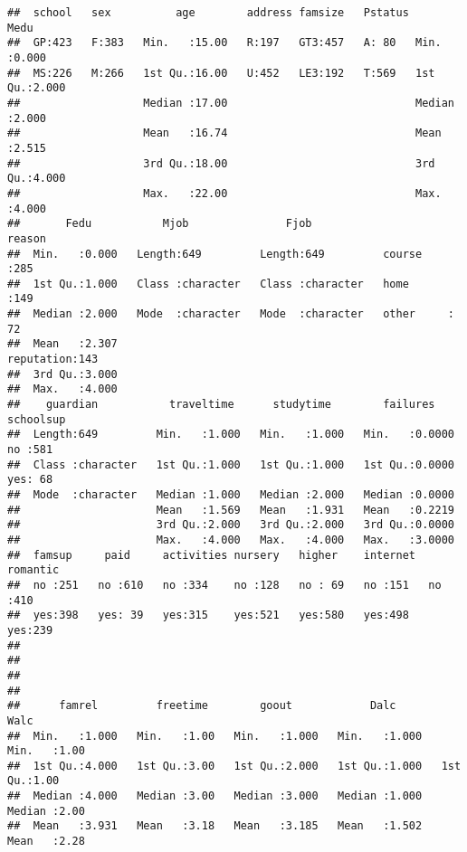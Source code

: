 \documentclass[
]{article}
\begin{document}
\begin{verbatim}
##  school   sex          age        address famsize   Pstatus      Medu      
##  GP:423   F:383   Min.   :15.00   R:197   GT3:457   A: 80   Min.   :0.000  
##  MS:226   M:266   1st Qu.:16.00   U:452   LE3:192   T:569   1st Qu.:2.000  
##                   Median :17.00                             Median :2.000  
##                   Mean   :16.74                             Mean   :2.515  
##                   3rd Qu.:18.00                             3rd Qu.:4.000  
##                   Max.   :22.00                             Max.   :4.000  
##       Fedu           Mjob               Fjob                  reason   
##  Min.   :0.000   Length:649         Length:649         course    :285  
##  1st Qu.:1.000   Class :character   Class :character   home      :149  
##  Median :2.000   Mode  :character   Mode  :character   other     : 72  
##  Mean   :2.307                                         reputation:143  
##  3rd Qu.:3.000                                                         
##  Max.   :4.000                                                         
##    guardian           traveltime      studytime        failures      schoolsup
##  Length:649         Min.   :1.000   Min.   :1.000   Min.   :0.0000   no :581  
##  Class :character   1st Qu.:1.000   1st Qu.:1.000   1st Qu.:0.0000   yes: 68  
##  Mode  :character   Median :1.000   Median :2.000   Median :0.0000            
##                     Mean   :1.569   Mean   :1.931   Mean   :0.2219            
##                     3rd Qu.:2.000   3rd Qu.:2.000   3rd Qu.:0.0000            
##                     Max.   :4.000   Max.   :4.000   Max.   :3.0000            
##  famsup     paid     activities nursery   higher    internet  romantic 
##  no :251   no :610   no :334    no :128   no : 69   no :151   no :410  
##  yes:398   yes: 39   yes:315    yes:521   yes:580   yes:498   yes:239  
##                                                                        
##                                                                        
##                                                                        
##                                                                        
##      famrel         freetime        goout            Dalc            Walc     
##  Min.   :1.000   Min.   :1.00   Min.   :1.000   Min.   :1.000   Min.   :1.00  
##  1st Qu.:4.000   1st Qu.:3.00   1st Qu.:2.000   1st Qu.:1.000   1st Qu.:1.00  
##  Median :4.000   Median :3.00   Median :3.000   Median :1.000   Median :2.00  
##  Mean   :3.931   Mean   :3.18   Mean   :3.185   Mean   :1.502   Mean   :2.28  

\end{verbatim}
\end{document}
